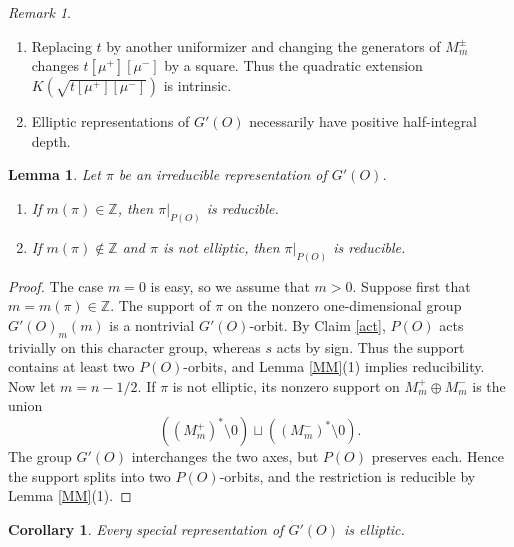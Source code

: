 \documentclass[11pt,a4paper,twoside]{amsart}
\newtheorem{lemma}[theorem]{Lemma}
\newtheorem{corollary}[theorem]{Corollary}
\theoremstyle{definition}
\theoremstyle{remark}
\newtheorem{remark}[theorem]{Remark}
\newcommand{\ZZ}{\mathbb Z}
\newcommand{\sm}{\setminus}
\begin{document}
\begin{remark}
\begin{enumerate}
\item Replacing $t$ by another uniformizer and changing the generators of $M_m^\pm$ changes $t[\mu^+][\mu^-]$ by a square. Thus the quadratic extension $K(\sqrt{t[\mu^+][\mu^-]})$ is intrinsic.
\item Elliptic representations of $G'(O)$ necessarily have positive half-integral depth.
\end{enumerate}
\end{remark}
\begin{lemma}\label{Gprime-nonelliptic}
Let $\pi$ be an irreducible representation of $G'(O)$.
\begin{enumerate}
\item If $m(\pi)\in\ZZ$, then $\pi|_{P(O)}$ is reducible.
\item If $m(\pi)\notin\ZZ$ and $\pi$ is not elliptic, then $\pi|_{P(O)}$ is reducible.
\end{enumerate}
\end{lemma}
\begin{proof}
The case $m=0$ is easy, so we assume that $m>0$.
Suppose first that $m=m(\pi)\in\ZZ$. The support of $\pi$ on the nonzero one-dimensional group $G'(O)_m(m)$ is a nontrivial $G'(O)$-orbit. By Claim \ref{act}, $P(O)$ acts trivially on this character group, whereas $s$ acts by sign. Thus the support contains at least two $P(O)$-orbits, and Lemma \ref{MM}(1) implies reducibility.
Now let $m=n-1/2$. If $\pi$ is not elliptic, its nonzero support on $M_m^+\oplus M_m^-$ is the union
$$
((M_m^+)^*\sm0)\sqcup((M_m^-)^*\sm0).
$$
The group $G'(O)$ interchanges the two axes, but $P(O)$ preserves each. Hence the support splits into two $P(O)$-orbits, and the restriction is reducible by Lemma \ref{MM}(1).
\end{proof}
\begin{corollary}
Every special representation of $G'(O)$ is elliptic.
\end{corollary}
\end{document}
